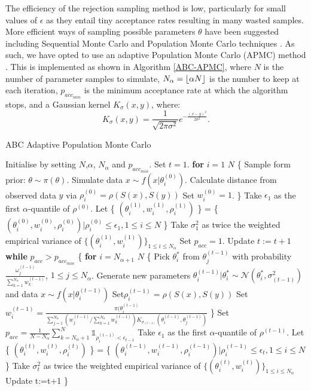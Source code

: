 \documentclass[twocolumn]{biophys}
\DeclarePairedDelimiter\floor{\lfloor}{\rfloor}
\begin{document}
The efficiency of the rejection sampling method is low, particularly for small values of $\epsilon$ as they entail tiny acceptance rates resulting in many wasted samples. 
More efficient ways of sampling possible parameters $\theta$ have been suggested including Sequential Monte Carlo and Population Monte Carlo techniques \citep{toni2009approximate, sisson2007sequential, beaumont2009adaptive, lenormand2013adaptive}.
As such, we have opted to use an adaptive Population Monte Carlo (APMC) method  \citep{lenormand2013adaptive}. 
This is implemented as shown in Algorithm \ref{ABC-APMC}, where $N$ is the number of parameter samples to simulate, $N_{\alpha} = \floor{\alpha N}$ is the number to keep at each iteration, $p_{acc_{min}}$ is the minimum acceptance rate at which the algorithm stops, and a Gaussian kernel $K_{\sigma}(x,y)$, where:
$$K_{\sigma}(x,y) = \frac{1}{\sqrt{2\pi \sigma^2}} e^{-\frac{(x-y)^2}{2\sigma^2}}.$$
\begin{algorithm}
\caption{ABC Adaptive Population Monte Carlo}\label{ABC-APMC}
\begin{algorithmic}[1]
\State Initialise by setting $N$,$\alpha$, $N_{\alpha}$ and $p_{acc_{min}}$.
\State Set $t=1$.
\State \textbf{for} $i=1$  $N$  \{
\State Sample form prior: $\theta \sim \pi (\theta)$. 
\State Simulate data $x \sim f \left(x|\theta_i^{(0)} \right)$.
\State Calculate distance from observed data $y$ via $\rho_i^{(0)} = \rho(S(x),S(y))$
\State Set $w_i^{(0)} = 1$.
\State \}
\State Take $\epsilon_1$ as the first $\alpha$-quantile of $\rho^{(0)}$.
\State Let \{ $(\theta_i^{(1)},w_i^{(1)}, \rho_i^{(1)})$ \} = \{ $(\theta_i^{(0)},w_i^{(0)}, \rho_i^{(0)}) | \rho_i^{(0)} \le \epsilon_1, 1 \le i \le N$ \} 
\State Take $\sigma_1^2$ as twice the weighted empirical variance of $\{(\theta_i^{(1)} ,w_i^{(1)}) \} _{1\le i \le N_{\alpha}}$
\State Set $p_{acc} = 1$.
\State Update $t:=t+1$
\State \textbf{while} $p_{acc}>p_{acc_{min}}$ \{ 
\State \textbf{for} $i=N_{\alpha+1}$  $N$ \{
\State Pick $\theta_i^{*}$ from $\theta_j^{(t-1)}$ with probability $\frac{\omega_j^{(t-1)}}{\sum_{k=1}^{N_{\alpha}} w_k^{(t-1)}  }$, $1 \le j \le N_{\alpha}$.  
\State Generate new parameters $\theta_i^{(t-1)}|\theta_i^{*} \sim \mathcal{N} \left(\theta_i^{*}, \sigma_{(t-1)}^2 \right)$ and data $x \sim f \left(x|\theta_i^{(t-1)} \right)$
\State Set$ \rho_i^{(t-1)} = \rho (S(x),S(y))$
\State Set $w_i^{(t-1)} = \frac{\pi(\theta_i^{(t-1)}}{\sum_{j=1}^{N_{\alpha}}(w_j^{(t-1)}/\sum_{k=1}^{N_{\alpha}} w_k^{(t-1)}) K_{\sigma_{(t-1)}}\left(\theta_i^{(t-1)},\theta_j^{(t-1)} \right) }$
\State \}
\State Set $p_{acc} = \frac{1}{N-N_{\alpha}} \sum_{k=N_{\alpha}+1}^N \mathds{1}_{\rho_i^{(t-1)} < \epsilon_{t-1}}$
\State Take $\epsilon_1$ as the first $\alpha$-quantile of $\rho^{(t-1)}$.
\State Let \{ $(\theta_i^{(t)},w_i^{(t)}, \rho_i^{(t)})$ \} = \{ $(\theta_i^{(t-1)},w_i^{(t-1)}, \rho_i^{(t-1)}) | \rho_i^{(t-1)} \le \epsilon_t, 1 \le i \le N$ \} 
\State Take $\sigma_t^2$ as twice the weighted empirical variance of $\{(\theta_i^{(t)} ,w_i^(t)) \} _{1\le i \le N_{\alpha}}$
\State Update t:=t+1
\State \}
\end{algorithmic}
\end{algorithm}
\end{document}
